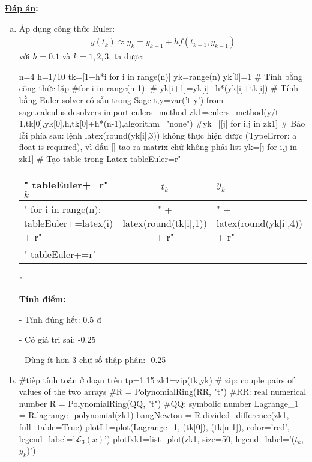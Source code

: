 \documentclass[12pt]{article}
\newcommand{\Solution}{
\medskip
{\bf \underline{Đáp án}:}
}
\begin{document}
\Solution
\begin{enumerate}[a).]
\item Áp dụng công thức Euler:
\begin{align*}
 y(t_k) \approx y_k = y_{k-1} + h f(t_{k-1},y_{k-1})
\end{align*}
với $h=0.1$ và $k=1, 2, 3$, ta được:
\begin{sagesilent}
 n=4
 h=1/10
 tk=[1+h*i for i in range(n)]
 yk=range(n)
 yk[0]=1
 # Tính bằng công thức lặp
 #for i in range(n-1):
 #  yk[i+1]=yk[i]+h*(yk[i]+tk[i])
 # Tính bằng Euler solver có sẵn trong Sage
 t,y=var('t y')
 from sage.calculus.desolvers import eulers_method
 zk1=eulers_method(y/t-1,tk[0],yk[0],h,tk[0]+h*(n-1),algorithm="none")
 #yk=[[j] for i,j in zk1] # Báo lỗi phía sau: lệnh latex(round(yk[i],3)) không thực hiện được (TypeError: a float is required), vì dấu [] tạo ra matrix chứ không phải list
 yk=[j for i,j in zk1]
 # Tạo table trong Latex
 tableEuler=r"\begin{tabular}{l|c|l}"
 tableEuler+=r"$k$ & $t_k$ & $y_k$ \\ \hline"
 for i in range(n):
   tableEuler+=latex(i) + r"&" + latex(round(tk[i],1)) + r"&" + latex(round(yk[i],4)) + r"\\"
 tableEuler+=r"\end{tabular}"
\end{sagesilent}

  \begin{center}  \end{center} 

  \textbf{Tính điểm:}
  
  - Tính đúng hết: 0.5 đ
  
  - Có giá trị sai: -0.25
  
  - Dùng ít hơn 3 chữ số thập phân: -0.25
  
\item
\begin{sagesilent}
 #tiếp tính toán ở đoạn trên
 tp=1.15
 zk1=zip(tk,yk) # zip: couple pairs of values of the two arrays
 #R = PolynomialRing(RR, "t") #RR: real numerical number
 R = PolynomialRing(QQ, "t") #QQ: symbolic number
 Lagrange_1 = R.lagrange_polynomial(zk1)
 bangNewton = R.divided_difference(zk1, full_table=True)
 plotL1=plot(Lagrange_1, (tk[0]), (tk[n-1]), color='red', legend_label='$\mathcal{L}_3(x)$')
 plotfxk1=list_plot(zk1, size=50, legend_label='($t_k$,$y_k$)')


\end{sagesilent}
\end{enumerate}
\end{document}
